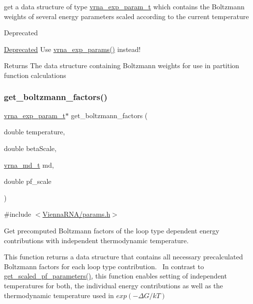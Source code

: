 get a data structure of type \hyperlink{group__energy__parameters_ga01d8b92fe734df8d79a6169482c7d8d8}{vrna\+\_\+exp\+\_\+param\+\_\+t} which contains the Boltzmann weights of several energy parameters scaled according to the current temperature

\begin{DoxyRefDesc}{Deprecated}
\item[\hyperlink{deprecated__deprecated000094}{Deprecated}]Use \hyperlink{group__energy__parameters_gab1f3016f96aa96bff020cdd904605afa}{vrna\+\_\+exp\+\_\+params()} instead!\end{DoxyRefDesc}


\begin{DoxyReturn}{Returns}
The data structure containing Boltzmann weights for use in partition function calculations 
\end{DoxyReturn}
\mbox{\label{group__energy__parameters_gaef2b931c7e9d4ffb0a5c33df50ec2068}} 
\subsubsection{\texorpdfstring{get\+\_\+boltzmann\+\_\+factors()}{get\_boltzmann\_factors()}}
{\footnotesize\ttfamily \hyperlink{group__energy__parameters_ga01d8b92fe734df8d79a6169482c7d8d8}{vrna\+\_\+exp\+\_\+param\+\_\+t}$\ast$ get\+\_\+boltzmann\+\_\+factors (\begin{DoxyParamCaption}\item[{double}]{temperature,  }\item[{double}]{beta\+Scale,  }\item[{\hyperlink{group__model__details_ga1f8a10e12a0a1915f2a4eff0b28ea17c}{vrna\+\_\+md\+\_\+t}}]{md,  }\item[{double}]{pf\+\_\+scale }\end{DoxyParamCaption})}



{\ttfamily \#include $<$\hyperlink{params_8h}{Vienna\+R\+N\+A/params.\+h}$>$}



Get precomputed Boltzmann factors of the loop type dependent energy contributions with independent thermodynamic temperature. 

This function returns a data structure that contains all necessary precalculated Boltzmann factors for each loop type contribution.~\newline
 In contrast to \hyperlink{group__energy__parameters_gabf3b9271c41dd3fac02d56e0b02b3344}{get\+\_\+scaled\+\_\+pf\+\_\+parameters()}, this function enables setting of independent temperatures for both, the individual energy contributions as well as the thermodynamic temperature used in $ exp(-\Delta G / kT) $

